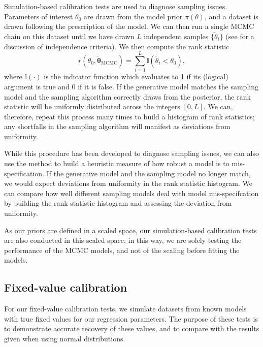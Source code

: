 \documentclass[fleqn,usenatbib]{rasti}
\begin{document}
Simulation-based calibration tests \citep{Cook:2006, Talts:2018} are used to
diagnose sampling issues. Parameters of interest $\theta_0$ are drawn from the
model prior $\pi(\theta)$, and a dataset is drawn following the prescription of
the model. We can then run a single MCMC chain on this dataset until we have
drawn $L$ independent samples $\{\tilde{\theta}_{i}\}$ (see \citet{Talts:2018}
for a discussion of independence criteria). We then compute the rank statistic
\begin{equation}
    r(\theta_0, \tilde{\boldsymbol{\theta}}_{\text{MCMC}})
        = \sum_{i = 1}^{L} \mathbb I (\tilde{\theta}_i < \theta_0),
\end{equation}
where $\mathbb{I}(\cdot)$ is the indicator function which evaluates to 1 if its
(logical) argument is true and 0 if it is false.  If the generative model
matches the sampling model and the sampling algorithm correctly draws from the
posterior, the rank statistic will be uniformly distributed across the integers
$[0, L]$. We can, therefore, repeat this process many times to build a histogram
of rank statistics; any shortfalls in the sampling algorithm will manifest as
deviations from uniformity.

While this procedure has been developed to diagnose sampling issues, we can also
use the method to build a heuristic measure of how robust a model is to
mis-specification. If the generative model and the sampling model no longer
match, we would expect deviations from uniformity in the rank statistic
histogram. We can compare how well different sampling models deal with model
mis-specifcation by building the rank statistic histogram and assessing the
deviation from uniformity.

As our priors are defined in a scaled space, our simulation-based calibration
tests are also conducted in this scaled space; in this way, we are solely
testing the performance of the MCMC models, and not of the scaling before
fitting the models.

\subsection{Fixed-value calibration}
\label{sec:methods.fixed}

For our fixed-value calibration tests, we simulate datasets from known models
with true fixed values for our regression parameters. The purpose of these tests
is to demonstrate accurate recovery of these values, and to compare with the
results given when using normal distributions.
\end{document}
